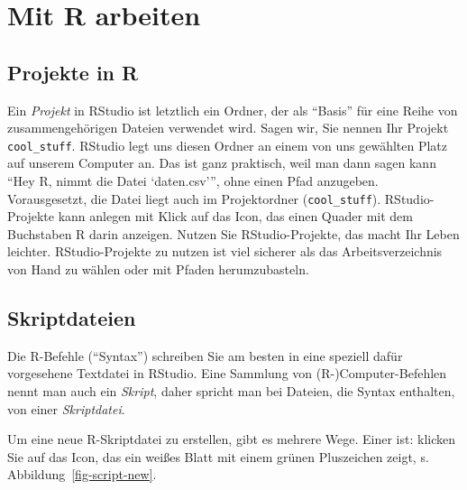 \documentclass[
  letterpaper,
  oneside,
  open=any]{scrbook}
\theoremstyle{definition}
\theoremstyle{definition}
\theoremstyle{definition}
\theoremstyle{remark}
\begin{document}
\section{Mit R arbeiten}\label{mit-r-arbeiten}

\subsection{Projekte in R}\label{projekte-in-r}

Ein \emph{Projekt} in RStudio ist letztlich ein Ordner, der als
\enquote{Basis} für eine Reihe von zusammengehörigen Dateien verwendet
wird. Sagen wir, Sie nennen Ihr Projekt \texttt{cool\_stuff}. RStudio
legt uns diesen Ordner an einem von uns gewählten Platz auf unserem
Computer an. Das ist ganz praktisch, weil man dann sagen kann
\enquote{Hey R, nimmt die Datei \enquote*{daten.csv}}, ohne einen Pfad
anzugeben. Vorausgesetzt, die Datei liegt auch im Projektordner
(\texttt{cool\_stuff}). RStudio-Projekte kann anlegen mit Klick auf das
Icon, das einen Quader mit dem Buchstaben R darin anzeigen. Nutzen Sie
RStudio-Projekte, das macht Ihr Leben leichter. RStudio-Projekte zu
nutzen ist viel sicherer als das Arbeitsverzeichnis von Hand zu wählen
oder mit Pfaden herumzubasteln.

\subsection{Skriptdateien}\label{skriptdateien}

Die R-Befehle (\enquote{Syntax}) schreiben Sie am besten in eine
speziell dafür vorgesehene Textdatei in RStudio. Eine Sammlung von
(R-)Computer-Befehlen nennt man auch ein \emph{Skript}, daher spricht
man bei Dateien, die Syntax enthalten, von einer \emph{Skriptdatei}.

Um eine neue R-Skriptdatei zu erstellen, gibt es mehrere Wege. Einer
ist: klicken Sie auf das Icon, das ein weißes Blatt mit einem grünen
Pluszeichen zeigt, s. Abbildung~\ref{fig-script-new}.
\end{document}
